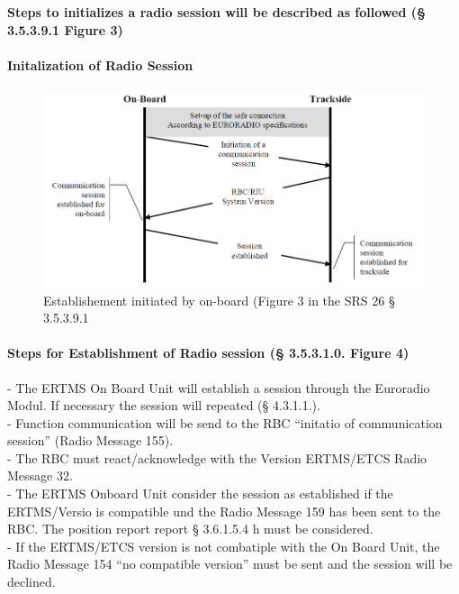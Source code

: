 \documentclass{template/openetcs_report}
\begin{document}
\textbf{Steps to initializes a radio session will be described as followed (§ 3.5.3.9.1 Figure 3)}\\

\paragraph{Initalization of Radio Session}
\begin{figure}[hbtp]
\centering
\includegraphics [scale=0.5]{images/startingRBCsession}
\caption{Establishement initiated by on-board (Figure 3 in the SRS 26 § 3.5.3.9.1}
\end{figure}
\newpage


\paragraph{Steps for Establishment of Radio session (§ 3.5.3.1.0. Figure 4)}
- The ERTMS On Board Unit will establish a session through the Euroradio Modul. If necessary the session will repeated (§ 4.3.1.1.).\\

- Function communication will be send to the RBC ``initatio of communication session'' (Radio Message 155).\\

- The RBC must react/acknowledge with the Version ERTMS/ETCS {Radio Message 32}.\\

- The ERTMS Onboard Unit consider the session as established if the ERTMS/Versio is compatible und the Radio Message 159 has been sent to the RBC. The position report report § 3.6.1.5.4 h must be considered.\\

- If the ERTMS/ETCS version is not combatiple with the On Board Unit, the Radio Message 154 ``no compatible version'' must be sent and the session will be declined.\\
\end{document}
